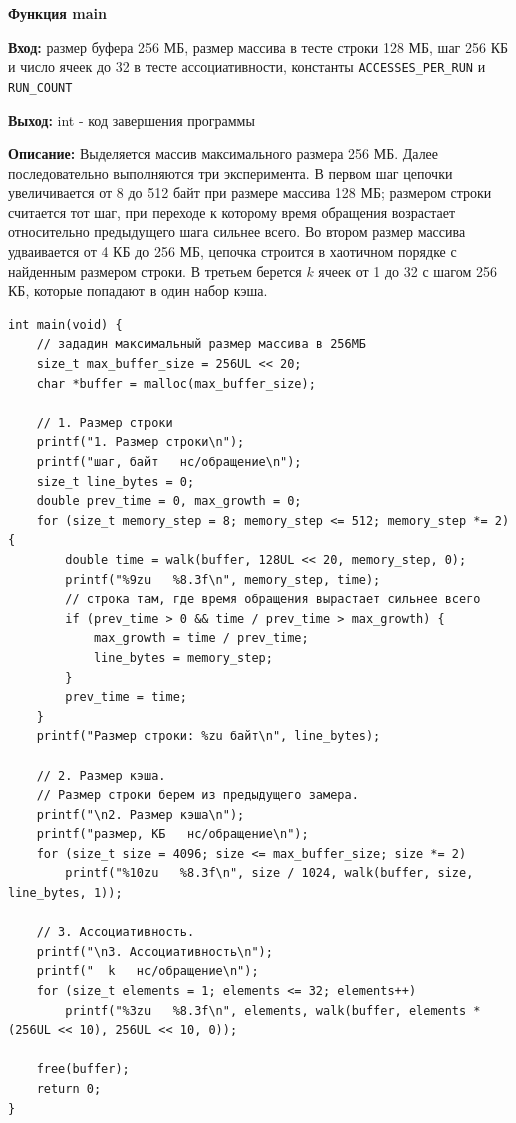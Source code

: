 \textbf{Функция main } \par
\textbf{Вход:}  размер буфера 256 МБ, размер массива в тесте строки 128 МБ, шаг 256 КБ и число ячеек до 32 в тесте ассоциативности, константы \texttt{ACCESSES\_PER\_RUN} и \texttt{RUN\_COUNT} \par
\textbf{Выход:} int - код завершения программы \par
\textbf{Описание:} Выделяется массив максимального размера 256 МБ. Далее последовательно выполняются три эксперимента. В первом шаг цепочки увеличивается от 8 до 512 байт при размере массива 128 МБ; размером строки считается тот шаг, при переходе к которому время обращения возрастает относительно предыдущего шага сильнее всего. Во втором размер массива удваивается от 4 КБ до 256 МБ, цепочка строится в хаотичном порядке с найденным размером строки. В третьем берется $k$ ячеек от 1 до 32 с шагом 256 КБ, которые попадают в один набор кэша.\par
\vspace{10pt}

\newpage
\begin{lstlisting}[caption=main, label=lst:main]
int main(void) {
    // зададин максимальный размер массива в 256МБ
    size_t max_buffer_size = 256UL << 20;
    char *buffer = malloc(max_buffer_size);

    // 1. Размер строки
    printf("1. Размер строки\n");
    printf("шаг, байт   нс/обращение\n");
    size_t line_bytes = 0;
    double prev_time = 0, max_growth = 0;
    for (size_t memory_step = 8; memory_step <= 512; memory_step *= 2) {
        double time = walk(buffer, 128UL << 20, memory_step, 0);
        printf("%9zu   %8.3f\n", memory_step, time);
        // строка там, где время обращения вырастает сильнее всего
        if (prev_time > 0 && time / prev_time > max_growth) {
            max_growth = time / prev_time;
            line_bytes = memory_step;
        }
        prev_time = time;
    }
    printf("Размер строки: %zu байт\n", line_bytes);

    // 2. Размер кэша. 
    // Размер строки берем из предыдущего замера.
    printf("\n2. Размер кэша\n");
    printf("размер, КБ   нс/обращение\n");
    for (size_t size = 4096; size <= max_buffer_size; size *= 2)
        printf("%10zu   %8.3f\n", size / 1024, walk(buffer, size, line_bytes, 1));

    // 3. Ассоциативность. 
    printf("\n3. Ассоциативность\n");
    printf("  k   нс/обращение\n");
    for (size_t elements = 1; elements <= 32; elements++)
        printf("%3zu   %8.3f\n", elements, walk(buffer, elements * (256UL << 10), 256UL << 10, 0));

    free(buffer);
    return 0;
}
\end{lstlisting}

\newpage
